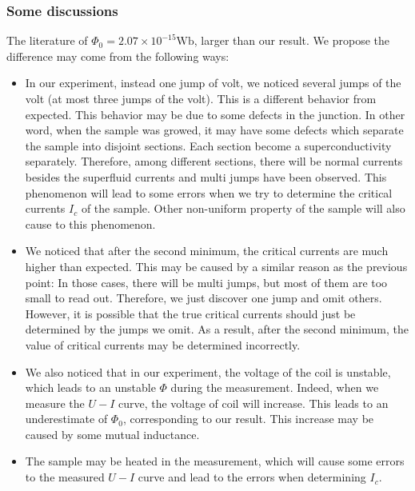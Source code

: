 \subsubsection{Some discussions}

The literature of $\Phi_{0}=2.07\times10^{-15}\mathrm{Wb}$, larger
than our result. We propose the difference may come from the following
ways:
\begin{itemize}
\item In our experiment, instead one jump of volt, we noticed several jumps
of the volt (at most three jumps of the volt). This is a different
behavior from expected. This behavior may be due to some defects in
the junction. In other word, when the sample was growed, it may have
some defects which separate the sample into disjoint sections. Each
section become a superconductivity separately. Therefore, among different
sections, there will be normal currents besides the superfluid currents
and multi jumps have been observed. This phenomenon will lead to some
errors when we try to determine the critical currents $I_{c}$ of
the sample. Other non-uniform property of the sample will also cause
to this phenomenon.
\item We noticed that after the second minimum, the critical currents are
much higher than expected. This may be caused by a similar reason
as the previous point: In those cases, there will be multi jumps,
but most of them are too small to read out. Therefore, we just discover
one jump and omit others. However, it is possible that the true critical
currents should just be determined by the jumps we omit. As a result,
after the second minimum, the value of critical currents may be determined
incorrectly.
\item We also noticed that in our experiment, the voltage of the coil is
unstable, which leads to an unstable $\Phi$ during the measurement.
Indeed, when we measure the $U-I$ curve, the voltage of coil will
increase. This leads to an underestimate of $\Phi_{0}$, corresponding
to our result. This increase may be caused by some mutual inductance.
\item The sample may be heated in the measurement, which will cause some
errors to the measured $U-I$ curve and lead to the errors when determining
$I_{c}$.
\end{itemize}
